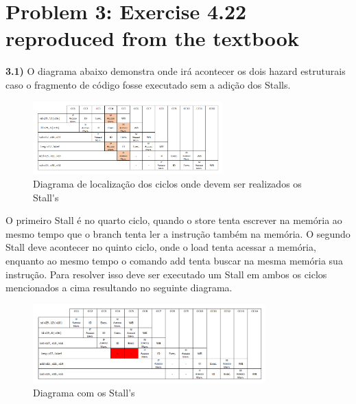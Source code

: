\documentclass[10pt]{article}
\begin{document}
\vspace{2.4 in}


\section*{Problem 3: Exercise 4.22 reproduced from the textbook}

\bigskip

\textbf{3.1)} O diagrama abaixo demonstra onde ir{\'a} acontecer os dois hazard estruturais caso o fragmento de c{\'o}digo fosse executado sem a adi{\c c}{\~a}o dos Stalls.

\begin{figure}[ht!]
\centering
\includegraphics[width=0.65\textwidth]{Diagrama_pipeLine.png}
\caption{Diagrama de localiza{\c c}{\~a}o dos ciclos onde devem ser realizados os Stall{\'}s}\label{sample image}
\end{figure}

\bigskip
\bigskip
O primeiro Stall {\'e} no quarto ciclo, quando o store tenta escrever na mem{\'o}ria ao mesmo tempo que o branch tenta ler a instru{\c c}{\~a}o tamb{\'e}m na mem{\'o}ria.
O segundo Stall deve acontecer no quinto ciclo, onde o load tenta acessar a mem{\'o}ria, enquanto ao mesmo tempo o comando add tenta buscar na mesma mem{\'o}ria sua instru{\c c}{\~a}o.
Para resolver isso deve ser executado um Stall em ambos os ciclos mencionados a cima resultando no seguinte diagrama.\\\bigskip \bigskip

\begin{figure}[ht!]
\centering
\includegraphics[width=0.80\textwidth]{Diagrama_pipeLine_Stalls.png}
\caption{Diagrama com os Stall's}\label{sample image}
\end{figure}
\end{document}
